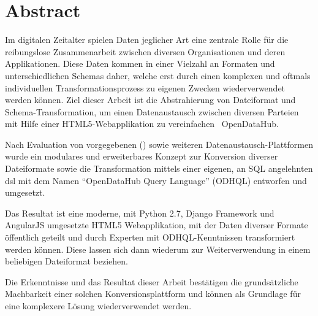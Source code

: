 \begin{comment}
2.1.2 Abstract
Ein Abstract ist eine rein textuelle kurze Zusammenfassung der Arbeit. Der Abstract ist für die Recherche in grossen Dokumentensammlungen geeignet. Er umfasst nie mehr als eine Seite, typisch sogar nur etwa 200 Worte (etwa 20 Zeilen).
Der Begriff ‚Kurzfassung’ ist zuwenig genau definiert; er soll wenn möglich vermieden werden.
\end{comment}


{}
\chapter*{Abstract}

Im digitalen Zeitalter spielen Daten jeglicher Art eine zentrale Rolle für die reibungslose Zusammenarbeit zwischen diversen Organisationen und deren Applikationen. Diese Daten kommen in einer Vielzahl an Formaten und unterschiedlichen Schemas daher, welche erst durch einen komplexen und oftmals individuellen Transformationsprozess zu eigenen Zwecken wiederverwendet werden können. Ziel dieser Arbeit ist die Abstrahierung von Dateiformat und Schema-Transformation, um einen Datenaustausch zwischen diversen Parteien mit Hilfe einer HTML5-Webapplikation zu vereinfachen \textendash\ OpenDataHub.

\medskip
Nach Evaluation von vorgegebenen () sowie weiteren Datenaustausch-Plattformen wurde ein modulares und erweiterbares Konzept zur Konversion diverser Dateiformate sowie die Transformation mittels einer eigenen, an SQL angelehnten \acl{dsl} mit dem Namen ``OpenDataHub Query Language'' (ODHQL) entworfen und umgesetzt.

\medskip
Das Resultat ist eine moderne, mit Python 2.7, Django Framework und AngularJS umgesetzte HTML5 Webapplikation, mit der Daten diverser Formate öffentlich geteilt und durch Experten mit ODHQL-Kenntnissen transformiert werden können. Diese lassen sich dann wiederum zur Weiterverwendung in einem beliebigen Dateiformat beziehen.

\medskip
Die Erkenntnisse und das Resultat dieser Arbeit bestätigen die grundsätzliche Machbarkeit einer solchen Konversionsplattform und können als Grundlage für eine komplexere Lösung wiederverwendet werden.


\glsresetall